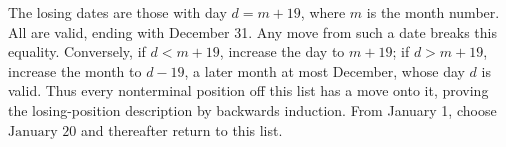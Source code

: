 The losing dates are those with day $d=m+19$, where $m$ is the month number. All are valid, ending with December 31. Any move from such a date breaks this equality. Conversely, if $d<m+19$, increase the day to $m+19$; if $d>m+19$, increase the month to $d-19$, a later month at most December, whose day $d$ is valid. Thus every nonterminal position off this list has a move onto it, proving the losing-position description by backwards induction. From January 1, choose $\boxed{\text{January 20}}$ and thereafter return to this list.
